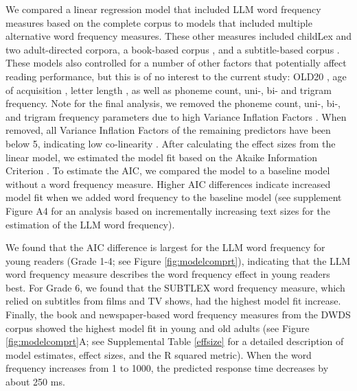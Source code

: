 \documentclass[doc, a4paper]{apa7}
\begin{document}
We compared a linear regression model that included LLM word frequency measures based on the complete corpus to models that included multiple alternative word frequency measures. These other measures included childLex and two adult-directed corpora, a book-based corpus \citep[DWDS][]{heister_dlexdb_2011}, and a subtitle-based corpus \citep[SUBTLEX][]{brysbaert_word_2011}. These models also controlled for a number of other factors that potentially affect reading performance, but this is of no interest to the current study: OLD20 \citep[e.g., ][]{yarkoni_moving_2008,hawelka_beyond_2013}, age of acquisition \citep[e.g., ][]{weekes_effects_2006}, letter length \citep[e.g., ][]{gagl_sources_2015, huestegge_oculomotor_2009, marinus_variability_2010, zoccolotti_word_2005}, as well as phoneme count, uni-, bi- and trigram frequency. Note for the final analysis, we removed the phoneme count, uni-, bi-, and trigram frequency parameters due to high Variance Inflation Factors \citep{fox_generalized_1992}. When removed, all Variance Inflation Factors of the remaining predictors have been below 5, indicating low co-linearity \citep[i.e., see][for a similar procedure]{gregorova_access_2023}. After calculating the effect sizes from the linear model, we estimated the model fit based on the Akaike Information Criterion \citep[AIC, ][]{akaike_new_1974}. To estimate the AIC, we compared the model to a baseline model without a word frequency measure. Higher AIC differences indicate increased model fit when we added word frequency to the baseline model (see supplement Figure A4 for an analysis based on incrementally increasing text sizes for the estimation of the LLM word frequency). 

We found that the AIC difference is largest for the LLM word frequency for young readers (Grade 1-4; see Figure \ref{fig:modelcomprt}), indicating that the LLM word frequency measure describes the word frequency effect in young readers best. For Grade 6, we found that the SUBTLEX word frequency measure, which relied on subtitles from films and TV shows, had the highest model fit increase. Finally, the book and newspaper-based word frequency measures from the DWDS corpus showed the highest model fit in young and old adults (see Figure \ref{fig:modelcomprt}A; see Supplemental Table \ref{effsize} for a detailed description of model estimates, effect sizes, and the R squared metric). When the word frequency increases from 1 to 1000, the predicted response time decreases by about 250 ms.
\end{document}
